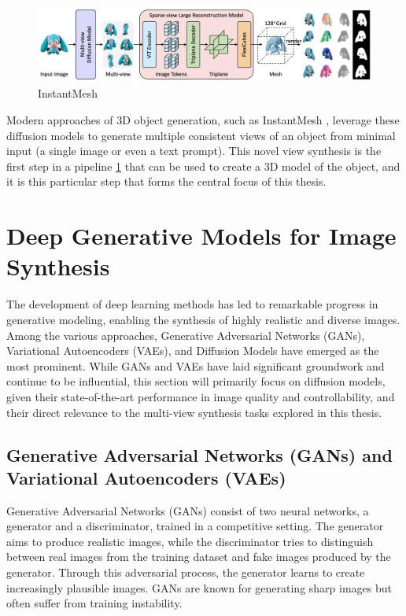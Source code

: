 \begin{figure}[h]
  \centering
  \includegraphics[width=\textwidth]{images/related-work/instantmesh.png}
  \caption{InstantMesh}
  \label{fig:instantmesh}
\end{figure}

Modern approaches of 3D object generation, such as InstantMesh \cite{instantmesh}, leverage these diffusion models to generate multiple consistent views of an object from minimal input (a single image or even a text prompt). This novel view synthesis is the first step in a pipeline \ref{fig:instantmesh} that can be used to create a 3D model of the object, and it is this particular step that forms the central focus of this thesis.

\section{Deep Generative Models for Image Synthesis}\label{sec:text-to-image}

The development of deep learning methods has led to remarkable progress in generative modeling, enabling the synthesis of highly realistic and diverse images. Among the various approaches, Generative Adversarial Networks (GANs), Variational Autoencoders (VAEs), and Diffusion Models have emerged as the most prominent. While GANs and VAEs have laid significant groundwork and continue to be influential, this section will primarily focus on diffusion models, given their state-of-the-art performance in image quality and controllability, and their direct relevance to the multi-view synthesis tasks explored in this thesis.

\subsection{Generative Adversarial Networks (GANs) and Variational Autoencoders (VAEs)}

Generative Adversarial Networks (GANs) \cite{gan} consist of two neural networks, a generator and a discriminator, trained in a competitive setting. The generator aims to produce realistic images, while the discriminator tries to distinguish between real images from the training dataset and fake images produced by the generator. Through this adversarial process, the generator learns to create increasingly plausible images. GANs are known for generating sharp images but often suffer from training instability.

